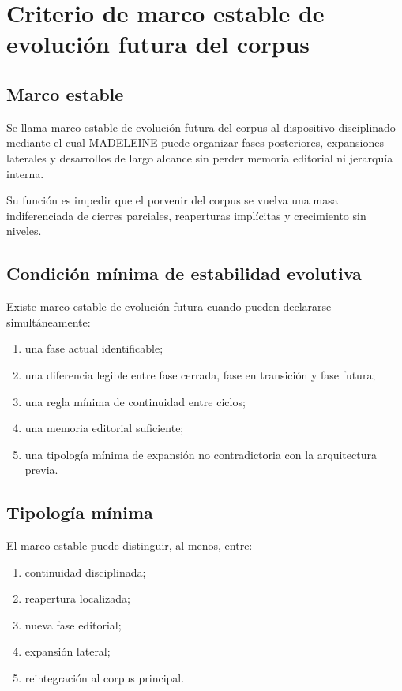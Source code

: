 \chapter{Criterio de marco estable de evolución futura del corpus}

\section{Marco estable}
\begin{definition}
Se llama marco estable de evolución futura del corpus al dispositivo disciplinado mediante el cual MADELEINE puede organizar fases posteriores, expansiones laterales y desarrollos de largo alcance sin perder memoria editorial ni jerarquía interna.
\end{definition}

\begin{observation}
Su función es impedir que el porvenir del corpus se vuelva una masa indiferenciada de cierres parciales, reaperturas implícitas y crecimiento sin niveles.
\end{observation}

\section{Condición mínima de estabilidad evolutiva}
\begin{definition}
Existe marco estable de evolución futura cuando pueden declararse simultáneamente:
\begin{enumerate}
  \item una fase actual identificable;
  \item una diferencia legible entre fase cerrada, fase en transición y fase futura;
  \item una regla mínima de continuidad entre ciclos;
  \item una memoria editorial suficiente;
  \item una tipología mínima de expansión no contradictoria con la arquitectura previa.
\end{enumerate}
\end{definition}

\section{Tipología mínima}
\begin{definition}
El marco estable puede distinguir, al menos, entre:
\begin{enumerate}
  \item continuidad disciplinada;
  \item reapertura localizada;
  \item nueva fase editorial;
  \item expansión lateral;
  \item reintegración al corpus principal.
\end{enumerate}
\end{definition}

